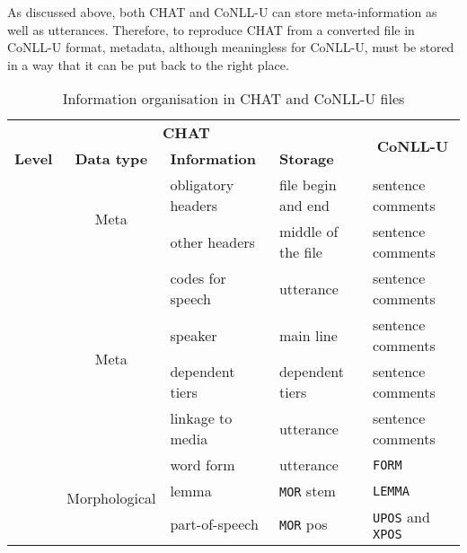 As discussed above, both CHAT and CoNLL-U can store meta-information as well as utterances. Therefore, to reproduce CHAT from a converted file in CoNLL-U format, metadata, although meaningless for CoNLL-U, must be stored in a way that it can be put back to the right place.
\clearpage

\begin{table}[h!]
\caption {Information organisation in CHAT and CoNLL-U files} \label{tab:grmap}
\centering
\begin{tabularx}{\widefigurewidth}{@{}lcXll@{}}
\toprule
\multicolumn{4}{c}{\textbf{CHAT}}& \multicolumn{1}{c}{\multirow{2}{*}{\textbf{CoNLL-U}}}\\
\cmidrule(lr){1-4}
\textbf{Level}& \textbf{Data type} & \textbf{Information} & \textbf{Storage} &\multicolumn{1}{l}{}\\
\midrule\addlinespace
\multicolumn{1}{l}{\multirow{2}{*}{\textbf{File}}}&\multicolumn{1}{c}{\multirow{2}{*}{Meta}}& obligatory headers    & file begin and end & sentence comments\\
\multicolumn{1}{l}{\multirow{2}{*}{}}&\multicolumn{1}{c}{\multirow{2}{*}{}}& other headers  & middle of the file & sentence comments\\\addlinespace
\cmidrule[0.1pt](lr{.75em}){1-3}
\addlinespace
\multicolumn{1}{l}{\multirow{4}{*}{\textbf{Sentence}}}&\multicolumn{1}{c}{\multirow{4}{*}{Meta}}& codes for speech & utterance & sentence comments\\
\multicolumn{1}{l}{\multirow{4}{*}{}}&\multicolumn{1}{c}{\multirow{4}{*}{}}& speaker          & main line & sentence comments\\
\multicolumn{1}{l}{\multirow{4}{*}{}}&\multicolumn{1}{c}{\multirow{4}{*}{}}& dependent tiers  & dependent tiers & sentence comments\\
\multicolumn{1}{l}{\multirow{4}{*}{}}&\multicolumn{1}{c}{\multirow{4}{*}{}}& linkage to media  & utterance & sentence comments\\\addlinespace
\cmidrule[0.1pt](lr{.75em}){1-3}
\addlinespace
\multicolumn{1}{l}{\multirow{11}{*}{\textbf{Token}}}  &\multicolumn{1}{c}{\multirow{4}{*}{Morphological}}& word form         & utterance & \texttt{FORM}\\
\multicolumn{1}{l}{\multirow{11}{*}{}}&\multicolumn{1}{c}{\multirow{4}{*}{}}& lemma           & \texttt{MOR} stem& \texttt{LEMMA}\\
\multicolumn{1}{l}{\multirow{11}{*}{}}&\multicolumn{1}{c}{\multirow{4}{*}{}}& part-of-speech  & \texttt{MOR} pos& \texttt{UPOS} and \texttt{XPOS}\\

\end{tabularx}
\end{table}
